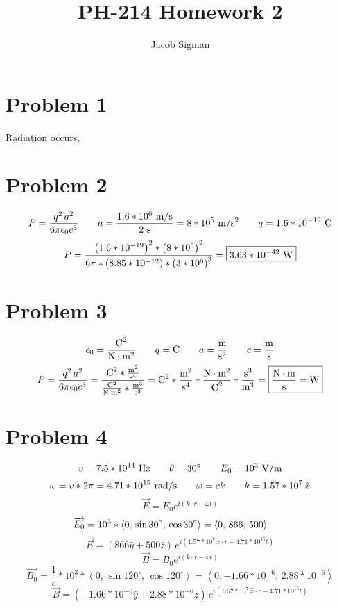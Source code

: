 \documentclass{article}
\title{PH-214 Homework 2}
\author{Jacob Sigman}
\date{}
\begin{document}
\maketitle
\section*{Problem 1}
Radiation occurs.
\section*{Problem 2}
\[P=\frac{q^2\,a^2}{6\pi\epsilon_0c^3}\hspace{7 mm}a=\frac{1.6*10^6 \textnormal{ m/s}}{2 \textnormal{ s}}=8*10^5 \textnormal{ m/}\textnormal{s}^2\hspace{7 mm}q=1.6*10^{-19} \textnormal{ C}\]
\[P=\frac{\left(1.6*10^{-19}\right)^2*\left(8*10^5\right)^2}{6\pi*\left(8.85*10^{-12}\right)*\left(3*10^8\right)^3}=\boxed{3.63*10^{-42} \textnormal{ W}}\]
\section*{Problem 3}
\[\epsilon_0=\frac{\textnormal{C}^2}{\textnormal{N}\cdot\textnormal{m}^2}\hspace{7 mm}q=\textnormal{C}\hspace{7 mm}a=\frac{\textnormal{m}}{\textnormal{s}^2}\hspace{7 mm}c=\frac{\textnormal{m}}{\textnormal{s}}\]
\[P=\frac{q^2\,a^2}{6\pi\epsilon_0c^3}=\frac{\textnormal{C}^2*\frac{\textnormal{m}^2}{\textnormal{s}^4}}{\frac{\textnormal{C}^2}{\textnormal{N}\cdot\textnormal{m}^2}*\frac{\textnormal{m}^3}{\textnormal{s}^3}}=\textnormal{C}^2*\frac{\textnormal{m}^2}{\textnormal{s}^4}*\frac{\textnormal{N}\cdot\textnormal{m}^2}{\textnormal{C}^2}*\frac{\textnormal{s}^3}{\textnormal{m}^3}=\boxed{\frac{\textnormal{N}\cdot\textnormal{m}}{\textnormal{s}}=\textnormal{W}}\]
\section*{Problem 4}
\[v=7.5*10^{14}\textnormal{ Hz}\hspace{7 mm}\theta=30^{\circ}\hspace{7 mm}E_0=10^3 \textnormal{ V/m}\]
\[\omega=v*2\pi=4.71*10^{15}\textnormal{ rad/s}\hspace{7 mm}\omega=ck\hspace{7 mm}k=1.57*10^7\,\hat{x}\]
\[\overrightarrow{E}=E_0e^{i(k\cdot r-\omega t)}\]
\[\overrightarrow{E_0}=10^3*\left<0,\,\sin30^{\circ},\,\cos30^{\circ}\right>=\left<0,\,866,\,500\right>\hspace{7 mm}\]
\[\overrightarrow{E}=\boxed{(866\hat{y}+500\hat{z})\,e^{i(1.57*10^7\,\hat{x}\cdot r-4.71*10^{15} t)}}\]
\[\overrightarrow{B}=B_0e^{i(k\cdot r-\omega t)}\]
\[\overrightarrow{B_0}=\frac{1}{c}*10^3*\left<0,\,\sin120^{\circ},\,\cos120^{\circ}\right>=\left<0,-1.66*10^{-6},\,2.88*10^{-6}\right>\]
\[\overrightarrow{B}=\boxed{(-1.66*10^{-6}\hat{y}+2.88*10^{-6}\hat{z})\,e^{i(1.57*10^7\,\hat{x}\cdot r-4.71*10^{15} t)}}\]
\end{document}
